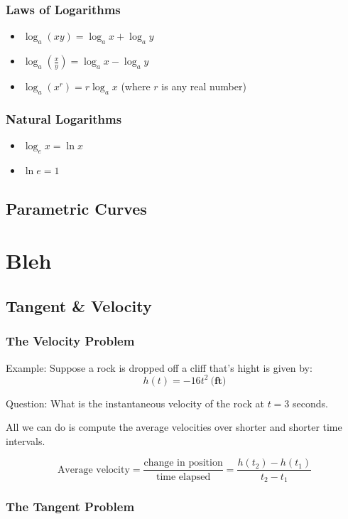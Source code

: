 \documentclass[11pt]{article}
\theoremstyle{plain}
\theoremstyle{definition}
\begin{document}
\subsubsection{Laws of Logarithms}
\begin{itemize}
	\item $\log_a(xy)=\log_a x + \log_a y$
	\item $\log_a(\frac{x}{y})=\log_a x - \log_a y$
	\item $\log_a(x^r)=r \log_a x$ (where $r$ is any real number)
\end{itemize}

\subsubsection{Natural Logarithms}
\begin{itemize}
	\item $\log_e x = \ln x$
	\item $\ln e = 1$
\end{itemize}




\subsection{Parametric Curves}

\section{Bleh}

\subsection{Tangent & Velocity}

\subsubsection{The Velocity Problem}

Example: Suppose a rock is dropped off a cliff that's hight is given by: $$h(t)=-16t^2\ \textbf{(ft)}$$

Question: What is the instantaneous velocity of the rock at $t=3$ seconds.

All we can do is compute the average velocities over shorter and shorter time intervals.

$$\text{Average velocity} = \frac{\text{change in position}}{\text{time elapsed}} = \frac{h(t_2)-h(t_1)}{t_2-t_1}$$

\subsubsection{The Tangent Problem}
\end{document}
